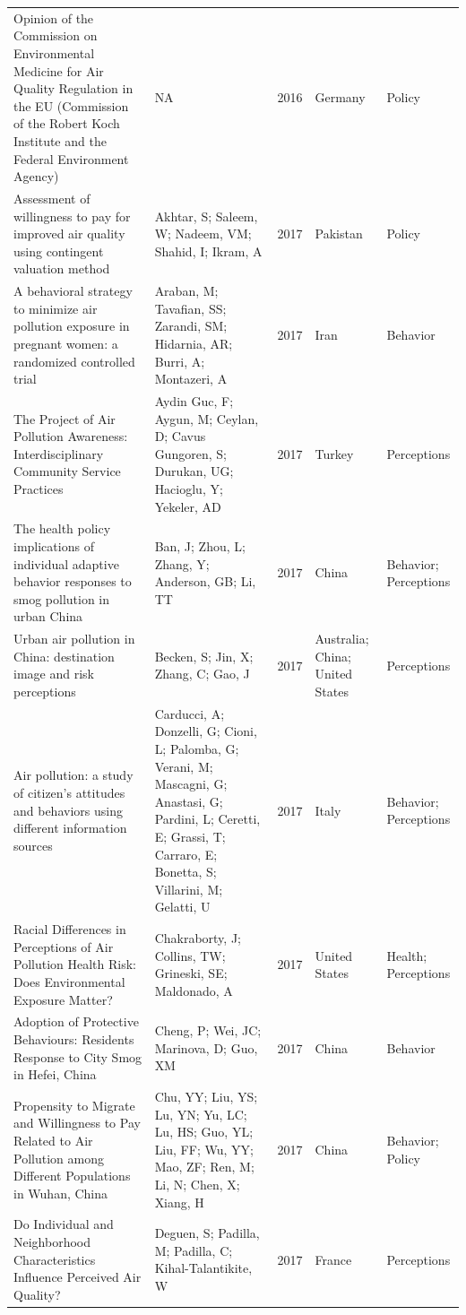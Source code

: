 {\begin{longtable}[t]{p{6cm}p{3cm}lp{3cm}p{3cm}}
Opinion of the Commission on Environmental Medicine for Air Quality Regulation in the EU (Commission of the Robert Koch Institute and the Federal Environment Agency) & NA & 2016 & Germany & Policy\\
Assessment of willingness to pay for improved air quality using contingent valuation method & Akhtar, S; Saleem, W; Nadeem, VM; Shahid, I; Ikram, A & 2017 & Pakistan & Policy\\
A behavioral strategy to minimize air pollution exposure in pregnant women: a randomized controlled trial & Araban, M; Tavafian, SS; Zarandi, SM; Hidarnia, AR; Burri, A; Montazeri, A & 2017 & Iran & Behavior\\
The Project of Air Pollution Awareness: Interdisciplinary Community Service Practices & Aydin Guc, F; Aygun, M; Ceylan, D; Cavus Gungoren, S; Durukan, UG; Hacioglu, Y; Yekeler, AD & 2017 & Turkey & Perceptions\\
\addlinespace
The health policy implications of individual adaptive behavior responses to smog pollution in urban China & Ban, J; Zhou, L; Zhang, Y; Anderson, GB; Li, TT & 2017 & China & Behavior; Perceptions\\
Urban air pollution in China: destination image and risk perceptions & Becken, S; Jin, X; Zhang, C; Gao, J & 2017 & Australia; China; United States & Perceptions\\
Air pollution: a study of citizen's attitudes and behaviors using different information sources & Carducci, A; Donzelli, G; Cioni, L; Palomba, G; Verani, M; Mascagni, G; Anastasi, G; Pardini, L; Ceretti, E; Grassi, T; Carraro, E; Bonetta, S; Villarini, M; Gelatti, U & 2017 & Italy & Behavior; Perceptions\\
Racial Differences in Perceptions of Air Pollution Health Risk: Does Environmental Exposure Matter? & Chakraborty, J; Collins, TW; Grineski, SE; Maldonado, A & 2017 & United States & Health; Perceptions\\
Adoption of Protective Behaviours: Residents Response to City Smog in Hefei, China & Cheng, P; Wei, JC; Marinova, D; Guo, XM & 2017 & China & Behavior\\
\addlinespace
Propensity to Migrate and Willingness to Pay Related to Air Pollution among Different Populations in Wuhan, China & Chu, YY; Liu, YS; Lu, YN; Yu, LC; Lu, HS; Guo, YL; Liu, FF; Wu, YY; Mao, ZF; Ren, M; Li, N; Chen, X; Xiang, H & 2017 & China & Behavior; Policy\\
Do Individual and Neighborhood Characteristics Influence Perceived Air Quality? & Deguen, S; Padilla, M; Padilla, C; Kihal-Talantikite, W & 2017 & France & Perceptions\\

\end{longtable}}
